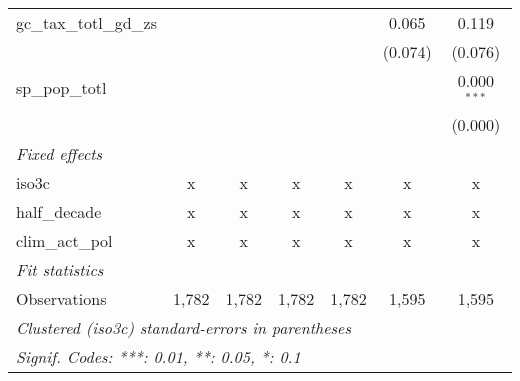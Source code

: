 \begin{tabular}{lcccccc}
   gc\_tax\_totl\_gd\_zs                                 &          &         &         &               & 0.065          & 0.119\\   
                                                         &          &         &         &               & (0.074)        & (0.076)\\   
   sp\_pop\_totl                                         &          &         &         &               &                & 0.000$^{***}$\\   
                                                         &          &         &         &               &                & (0.000)\\   
   \emph{Fixed effects}\\
   iso3c                                                 & x        & x       & x       & x             & x              & x\\  
   half\_decade                                          & x        & x       & x       & x             & x              & x\\  
   clim\_act\_pol                                        & x        & x       & x       & x             & x              & x\\  
   \midrule \emph{Fit statistics}\\
   Observations                                          & 1,782    & 1,782   & 1,782   & 1,782         & 1,595          & 1,595\\  
   \midrule
   \multicolumn{7}{l}{\emph{Clustered (iso3c) standard-errors in parentheses}}\\
   \multicolumn{7}{l}{\emph{Signif. Codes: ***: 0.01, **: 0.05, *: 0.1}}\\
\end{tabular}
\par\endgroup



